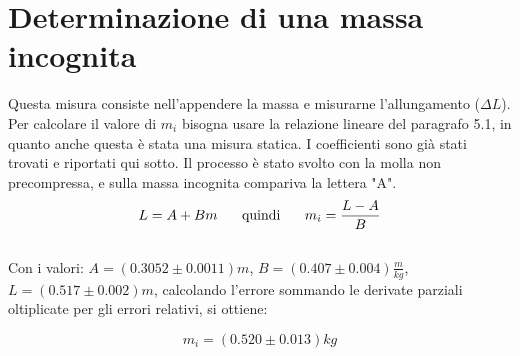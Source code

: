 \documentclass[12pt, a4paper]{article}
\begin{document}
\newpage
\section{Determinazione di una massa incognita}
Questa misura consiste nell'appendere la massa e misurarne l'allungamento ($\Delta L$). Per calcolare il valore di $m_i$ bisogna usare la relazione lineare del paragrafo 5.1, in quanto anche questa è stata una misura statica. I coefficienti sono già stati trovati e riportati qui sotto. 
Il processo è stato svolto con la molla non precompressa, e sulla massa incognita compariva la lettera "A".\\

\begin{equation}
    L = A + Bm  \mbox{\hspace{0.5cm} quindi \hspace{0.5cm}}  m_i = \frac{L - A}{B}
\end{equation}\\

Con i valori: $A = (0.3052 \pm 0.0011)m$, $B = (0.407 \pm 0.004)\frac{m}{kg}$, $L = (0.517 \pm 0.002)m$, calcolando l'errore sommando le derivate parziali oltiplicate per gli errori relativi, si ottiene: 

\begin{equation} 
    m_i = (0.520 \pm 0.013)kg 
\end{equation}
\end{document}
